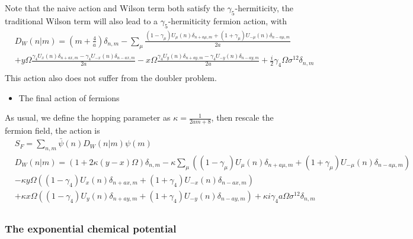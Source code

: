 Note that the naive action and Wilson term both satisfy the $\gamma _5$-hermiticity, the traditional Wilson term will also lead to a $\gamma _5$-hermiticity fermion action, with
\begin{equation}
\begin{split}
&D_W(n|m)=\left(m+\frac{4}{a}\right)\delta _{n,m}-\sum _{\mu}\frac{(1-\gamma _{\mu})U_{\mu}(n)\delta _{n+a\mu,m}+(1+\gamma _{\mu})U_{-\mu}(n)\delta _{n-a\mu,m}}{2a}\\
&+y\Omega \frac{\gamma _4U_{x}(n)\delta _{n+ax,m}-\gamma _4U_{-x}(n)\delta _{n-ax,m}}{2a}-x\Omega \frac{\gamma _4U_{y}(n)\delta _{n+ay,m}-\gamma _4U_{-y}(n)\delta _{n-ay,m}}{2a} +\frac{i}{2}\gamma _4\Omega \sigma ^{12}\delta _{n,m}\\
\end{split}
\end{equation}
This action also does not suffer from the doubler problem.

\begin{itemize}
  \item The final action of fermions
\end{itemize}

As usual, we define the hopping parameter as $\kappa = \frac{1}{2am+8}$, then rescale the fermion field, the action is
\begin{equation}
\begin{split}
&S_F=\sum _{n,m}\bar{\psi }(n) D_W(n|m) \psi(m)\\
&D_W(n|m)=\left(1+2\kappa(y-x)\Omega\right)\delta _{n,m}-\kappa\sum _{\mu}\left((1-\gamma _{\mu})U_{\mu}(n)\delta _{n+a\mu,m}+(1+\gamma _{\mu})U_{-\mu}(n)\delta _{n-a\mu,m}\right)\\
&-\kappa y\Omega \left((1-\gamma _4)U_{x}(n)\delta _{n+ax,m}+(1+\gamma _4)U_{-x}(n)\delta _{n-ax,m}\right)\\
&+\kappa x\Omega \left((1-\gamma _4)U_{y}(n)\delta _{n+ay,m}+(1+\gamma _4)U_{-y}(n)\delta _{n-ay,m}\right) +\kappa i\gamma _4a\Omega \sigma ^{12}\delta _{n,m}\\
\end{split}
\end{equation}

\subsubsection{\label{sec:ExponentialChemicalPotential}The exponential chemical potential}

